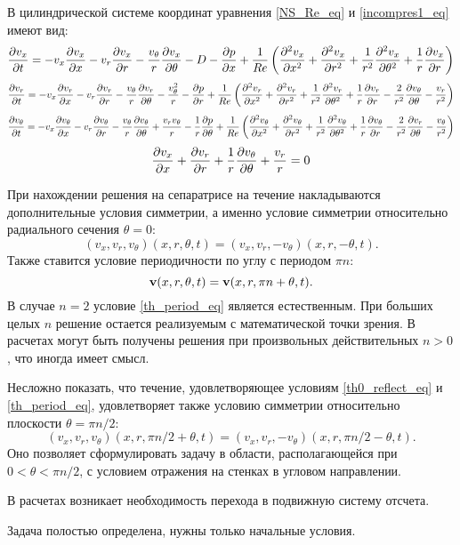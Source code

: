 В цилиндрической системе координат уравнения \eqref{NS_Re_eq} и \eqref{incompres1_eq} имеют вид:
\begin{equation*}
\frac{\partial v_x}{\partial t}  = - v_x \frac{\partial v_x}{\partial x} - v_r \frac{\partial v_x}{\partial r} - \frac{v_\theta}{r} \frac{\partial v_x}{\partial \theta} - D - \frac{\partial p}{\partial x} + \frac{1}{Re}  \left( \frac{\partial^2 v_x}{\partial x^2} + \frac{\partial^2 v_x}{\partial r^2} + \frac{1}{r^2}\frac{\partial^2 v_x}{\partial \theta^2} + \frac{1}{r}\frac{\partial v_x}{\partial r} \right)
\end{equation*} 
\begin{equation*}
\frac{\partial v_r}{\partial t}  = - v_x \frac{\partial v_r}{\partial x} - v_r \frac{\partial v_r}{\partial r} - \frac{v_\theta}{r} \frac{\partial v_r}{\partial \theta} - \frac{v^2_\theta}{r}  - \frac{\partial p}{\partial r} + \frac{1}{Re}  \left( \frac{\partial^2 v_r}{\partial x^2} + \frac{\partial^2 v_r}{\partial r^2} + \frac{1}{r^2}\frac{\partial^2 v_r}{\partial \theta^2} + \frac{1}{r}\frac{\partial v_r}{\partial r} - \frac{2}{r^2}\frac{\partial v_\theta}{\partial \theta} - \frac{v_r}{r^2} \right)
\end{equation*}
\begin{equation*}
\frac{\partial v_\theta}{\partial t}  = - v_x \frac{\partial v_\theta}{\partial x} - v_r \frac{\partial v_\theta}{\partial r} - \frac{v_\theta}{r} \frac{\partial v_\theta}{\partial \theta} + \frac{v_r v_\theta}{r}  - \frac{1}{r}\frac{\partial p}{\partial \theta} + \frac{1}{Re}  \left( \frac{\partial^2 v_\theta}{\partial x^2} + \frac{\partial^2 v_\theta}{\partial r^2} + \frac{1}{r^2}\frac{\partial^2 v_\theta}{\partial \theta^2} + \frac{1}{r}\frac{\partial v_\theta}{\partial r} - \frac{2}{r^2}\frac{\partial v_r}{\partial \theta} - \frac{v_\theta}{r^2} \right)
\end{equation*}
\begin{equation*}
\frac{\partial v_x}{\partial x} + \frac{\partial v_r}{\partial r} + \frac{1}{r} \frac{\partial v_\theta}{\partial \theta} + \frac{v_r}{r} = 0
\end{equation*}


При нахождении решения на сепаратрисе на течение накладываются дополнительные условия симметрии, а именно условие симметрии относительно радиального сечения $\theta = 0$:
\begin{equation}\label{th0_reflect_eq}
(v_x, v_r, v_\theta)(x, r, \theta, t) = (v_x, v_r, -v_\theta)(x, r, -\theta, t).
\end{equation}
Также ставится условие периодичности по углу с периодом $\pi n$: 
\begin{equation}\label{th_period_eq}
\mathbf{v}(x, r, \theta, t) = \mathbf{v}(x, r, \pi n + \theta, t).
\end{equation}
В случае $n = 2$ условие \eqref{th_period_eq} является естественным. При больших целых $n$ решение остается реализуемым с математической точки зрения. В расчетах могут быть получены решения при произвольных действительных $n > 0$, что иногда имеет смысл. 


Несложно показать, что течение, удовлетворяющее условиям \eqref{th0_reflect_eq} и \eqref{th_period_eq}, удовлетворяет также условию симметрии относительно плоскости $\theta = \pi n / 2$:
\begin{equation}
(v_x, v_r, v_\theta)(x, r, \pi n/2 + \theta, t) = (v_x, v_r, -v_\theta)(x, r, \pi n / 2 - \theta, t).
\end{equation}
Оно позволяет сформулировать задачу в области, располагающейся при $0 < \theta < \pi n/2$, с условием отражения на стенках в угловом направлении. 


В расчетах возникает необходимость перехода в подвижную систему отсчета. 


Задача полостью определена, нужны только начальные условия. 







